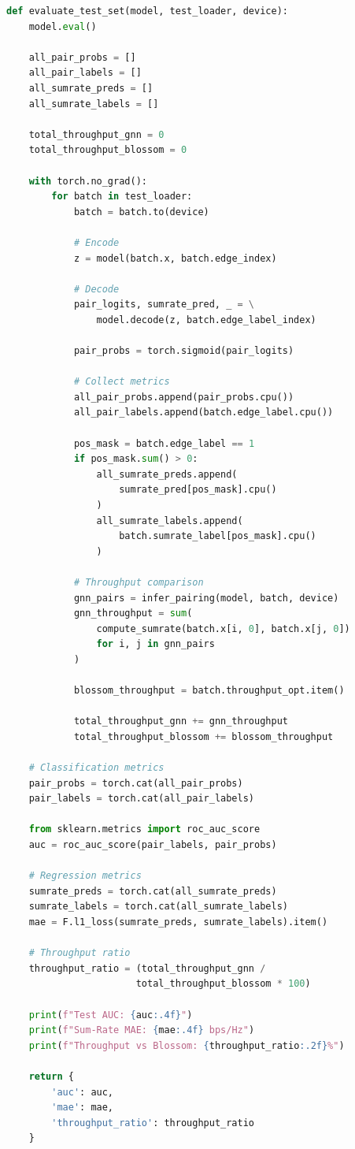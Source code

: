 \begin{lstlisting}[language=Python, caption={Complete Evaluation on Test Set}]
def evaluate_test_set(model, test_loader, device):
    model.eval()
    
    all_pair_probs = []
    all_pair_labels = []
    all_sumrate_preds = []
    all_sumrate_labels = []
    
    total_throughput_gnn = 0
    total_throughput_blossom = 0
    
    with torch.no_grad():
        for batch in test_loader:
            batch = batch.to(device)
            
            # Encode
            z = model(batch.x, batch.edge_index)
            
            # Decode
            pair_logits, sumrate_pred, _ = \
                model.decode(z, batch.edge_label_index)
            
            pair_probs = torch.sigmoid(pair_logits)
            
            # Collect metrics
            all_pair_probs.append(pair_probs.cpu())
            all_pair_labels.append(batch.edge_label.cpu())
            
            pos_mask = batch.edge_label == 1
            if pos_mask.sum() > 0:
                all_sumrate_preds.append(
                    sumrate_pred[pos_mask].cpu()
                )
                all_sumrate_labels.append(
                    batch.sumrate_label[pos_mask].cpu()
                )
            
            # Throughput comparison
            gnn_pairs = infer_pairing(model, batch, device)
            gnn_throughput = sum(
                compute_sumrate(batch.x[i, 0], batch.x[j, 0])
                for i, j in gnn_pairs
            )
            
            blossom_throughput = batch.throughput_opt.item()
            
            total_throughput_gnn += gnn_throughput
            total_throughput_blossom += blossom_throughput
    
    # Classification metrics
    pair_probs = torch.cat(all_pair_probs)
    pair_labels = torch.cat(all_pair_labels)
    
    from sklearn.metrics import roc_auc_score
    auc = roc_auc_score(pair_labels, pair_probs)
    
    # Regression metrics
    sumrate_preds = torch.cat(all_sumrate_preds)
    sumrate_labels = torch.cat(all_sumrate_labels)
    mae = F.l1_loss(sumrate_preds, sumrate_labels).item()
    
    # Throughput ratio
    throughput_ratio = (total_throughput_gnn / 
                       total_throughput_blossom * 100)
    
    print(f"Test AUC: {auc:.4f}")
    print(f"Sum-Rate MAE: {mae:.4f} bps/Hz")
    print(f"Throughput vs Blossom: {throughput_ratio:.2f}%")
    
    return {
        'auc': auc,
        'mae': mae,
        'throughput_ratio': throughput_ratio
    }
\end{lstlisting}
